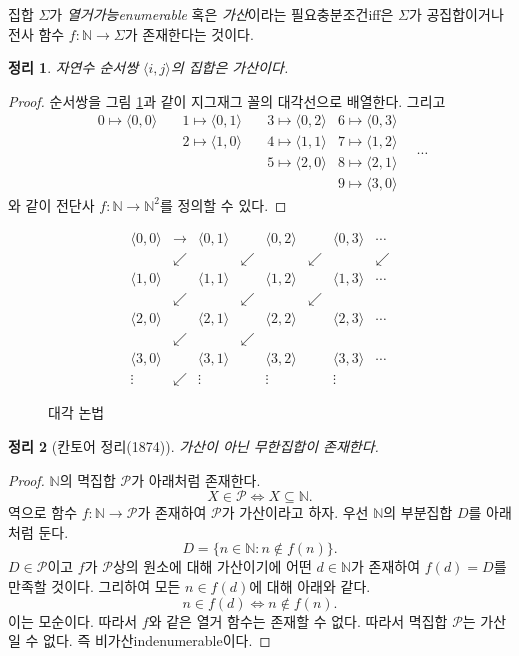 \documentclass[a4paper,chapter,atbegshi]{oblivoir}
\newtheorem{theo}{정리}[chapter]
\begin{document}
집합 $\Sigma$가 \emph{열거가능\tiny enumerable} 혹은 \emph{가산}이라는
필요충분조건{\tiny iff}은 $\Sigma$가 공집합이거나 전사 함수 $f:\mathbb{N}
\rightarrow\Sigma$가 존재한다는 것이다. 
\begin{theo}
  자연수 순서쌍 $\langle i,j\rangle$의 집합은 가산이다.
\end{theo}
\begin{proof}
  순서쌍을 그림 \ref{fig:11}과 같이 지그재그 꼴의 대각선으로 배열한다.
  그리고
  \[
  \begin{matrix}
     0\mapsto\langle0,0\rangle\quad
     &1\mapsto\langle0,1\rangle\quad
     &3\mapsto\langle0,2\rangle
     &6\mapsto\langle0,3\rangle\\
     &2\mapsto\langle1,0\rangle\quad
     &4\mapsto\langle1,1\rangle
     &7\mapsto\langle1,2\rangle\\
     &&5\mapsto\langle2,0\rangle
     &8\mapsto\langle 2,1\rangle\\
     &&&9\mapsto\langle3,0\rangle
  \end{matrix}
  \quad\cdots
  \]
  와 같이 전단사 $f:\mathbb{N}\rightarrow\mathbb{N}^2$를 정의할 수 있다.
\end{proof}
\begin{figure}[h]
\[
\begin{matrix}
\langle 0,0\rangle &\rightarrow &\langle 0,1\rangle & &\langle0,2\rangle & &\langle 0,3\rangle &\cdots \\
&\swarrow & &\swarrow & &\swarrow & &\swarrow \\
\langle 1,0\rangle & &\langle 1,1\rangle & &\langle 1,2\rangle &&\langle1,3\rangle&\cdots \\
&\swarrow &&\swarrow &&\swarrow && \\
\langle2,0\rangle&&\langle2,1\rangle&&\langle2,2\rangle&&\langle2,3\rangle&\cdots\\
&\swarrow&&\swarrow&&&&\\
\langle3,0\rangle&&\langle3,1\rangle&&\langle3,2\rangle&&\langle3,3\rangle&\cdots\\
\vdots&\swarrow&\vdots&&\vdots&&\vdots&
\end{matrix}
\]
\caption{\label{fig:11}대각 논법}
\end{figure}
\begin{theo}[칸토어 정리(1874)]
  가산이 아닌 무한집합이 존재한다.
\end{theo}
\begin{proof}
  $\mathbb{N}$의 멱집합 $\mathcal{P}$가 아래처럼 존재한다.
  \[
    X\in\mathcal{P}\iff X\subseteq\mathbb{N}.
  \]
  역으로 함수 $f:\mathbb{N}\rightarrow\mathcal{P}$가 존재하여
  $\mathcal{P}$가 가산이라고 하자. 우선 $\mathbb{N}$의 부분집합 $D$를 아래처럼
  둔다.
  \[
    D=\{n\in\mathbb{N}:n\notin f(n)\}.
  \]
  $D\in\mathcal{P}$이고 $f$가 $\mathcal{P}$상의 원소에 대해 가산이기에 어떤
  $d\in\mathbb{N}$가 존재하여 $f(d)=D$를 만족할 것이다. 그리하여 모든 $n\in 
  f(d)$에 대해 아래와 같다. 
  \[
    n\in f(d) \iff n \notin f(n).
  \]
  이는 모순이다. 따라서 $f$와 같은 열거 함수는 존재할 수 없다. 따라서
  멱집합 $\mathcal{P}$는 가산일 수 없다. 즉 비가산{\tiny indenumerable}이다. 
\end{proof}
\end{document}
